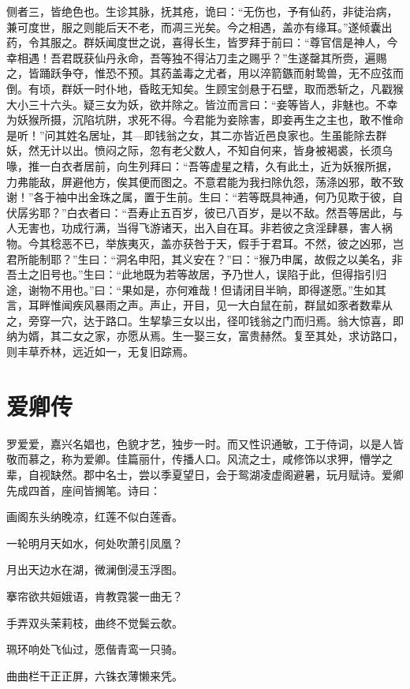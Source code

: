 \documentclass[a4paper,12pt,UTF8,twoside]{ctexbook}
\begin{document}
侧者三，皆绝色也。生诊其脉，抚其疮，诡曰：“无伤也，予有仙药，非徒治病，兼可度世，服之则能后天不老，而凋三光矣。今之相遇，盖亦有缘耳。”遂倾囊出药，令其服之。群妖闻度世之说，喜得长生，皆罗拜于前曰：“尊官信是神人，今幸相遇！吾君既获仙丹永命，吾等独不得沾刀圭之赐乎？”生遂罄其所赍，遍赐之，皆踊跃争夺，惟恐不预。其药盖毒之尤者，用以淬箭鏃而射鸷兽，无不应弦而倒。有顷，群妖一时仆地，昏眩无知矣。生顾宝剑悬于石壁，取而悉斩之，凡戳猴大小三十六头。疑三女为妖，欲并除之。皆泣而言曰：“妾等皆人，非魅也。不幸为妖猴所摄，沉陷坑阱，求死不得。今君能为妾除害，即妾再生之主也，敢不惟命是听！”问其姓名居址，其—即钱翁之女，其二亦皆近邑良家也。生虽能除去群妖，然无计以出。愤闷之际，忽有老父数人，不知自何来，皆身被褐裘，长须乌喙，推一白衣者居前，向生列拜曰：“吾等虚星之精，久有此土，近为妖猴所据，力弗能敌，屏避他方，俟其便而图之。不意君能为我扫除仇怨，荡涤凶邪，敢不致谢！”各于袖中出金珠之属，置于生前。生曰：“若等既具神通，何乃见欺于彼，自伏孱劣耶？”白衣者曰：“吾寿止五百岁，彼已八百岁，是以不敌。然吾等居此，与人无害也，功成行满，当得飞游诸天，出入自在耳。非若彼之贪淫肆暴，害人祸物。今其稔恶不已，举族夷灭，盖亦获咎于天，假手于君耳。不然，彼之凶邪，岂君所能制耶？”生曰：“洞名申阳，其义安在？”曰：“猴乃申属，故假之以美名，非吾土之旧号也。”生曰：“此地既为若等故居，予乃世人，误陷于此，但得指引归途，谢物不用也。”曰：“果如是，亦何难哉！但请闭目半晌，即得遂愿。”生如其言，耳畔惟闻疾风暴雨之声。声止，开目，见一大白鼠在前，群鼠如豕者数辈从之，旁穿一穴，达于路口。生挈挚三女以出，径叩钱翁之门而归焉。翁大惊喜，即纳为婿，其二女之家，亦愿从焉。生一娶三女，富贵赫然。复至其处，求访路口，则丰草乔林，远近如一，无复旧踪焉。

\chapter{爱卿传}

罗爱爱，嘉兴名娼也，色貌才艺，独步一时。而又性识通敏，工于侍词，以是人皆敬而慕之，称为爱卿。佳篇丽什，传播人口。风流之士，咸修饰以求狎，懵学之辈，自视缺然。郡中名士，尝以季夏望日，会于鸳湖凌虚阁避暑，玩月赋诗。爱卿先成四首，座间皆搁笔。诗曰：

画阁东头纳晚凉，红莲不似白莲香。

一轮明月天如水，何处吹萧引凤凰？

月出天边水在湖，微澜倒浸玉浮图。

搴帘欲共姮娥语，肯教霓裳一曲无？

手弄双头茉莉枝，曲终不觉鬓云欹。

珮环响处飞仙过，愿偕青鸾一只骑。

曲曲栏干正正屏，六铢衣薄懒来凭。
\end{document}
